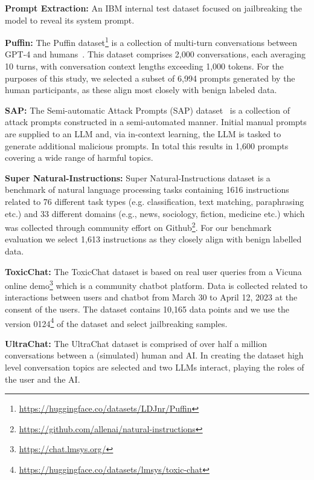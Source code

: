 \noindent\textbf{Prompt Extraction:} An IBM internal test dataset focused on jailbreaking the model to reveal its system prompt.

\noindent\textbf{Puffin:} The Puffin dataset\footnote{\url{https://huggingface.co/datasets/LDJnr/Puffin}} is a collection of multi-turn conversations between GPT-4 and humans~\cite{puffindataset}. This dataset comprises 2,000 conversations, each averaging 10 turns, with conversation context lengths exceeding 1,000 tokens. For the purposes of this study, we selected a subset of 6,994 prompts generated by the human participants, as these align most closely with benign labeled data. 

\noindent\textbf{SAP:} The Semi-automatic Attack Prompts (SAP) dataset~\cite{deng2023attack} is a collection of attack prompts constructed in a semi-automated manner. Initial manual prompts are supplied to an LLM and, via in-context learning, the LLM is tasked to generate additional malicious prompts. In total this results in 1,600 prompts covering a wide range of harmful topics.

\noindent\textbf{Super Natural-Instructions:} Super Natural-Instructions dataset \cite{wang2022super} is a benchmark of natural language processing tasks containing 1616 instructions related to 76 different task types (e.g. classification, text matching, paraphrasing etc.) and 33 different domains (e.g., news, sociology, fiction, medicine etc.) which was collected through community effort on Github\footnote{\url{https://github.com/allenai/natural-instructions}}. For our benchmark evaluation we select 1,613 instructions as they closely align with benign labelled data. 

\noindent\textbf{ToxicChat:} The ToxicChat dataset \cite{lin2023toxicchat} is based on real user queries from a Vicuna online demo\footnote{\url{https://chat.lmsys.org/}} which is a community chatbot platform. Data is collected related to interactions between users and chatbot from March 30 to April 12, 2023 at the consent of the users. The dataset contains 10,165 data points and we use the version 0124\footnote{\url{https://huggingface.co/datasets/lmsys/toxic-chat}} of the dataset and select jailbreaking samples. 

\noindent\textbf{UltraChat:} The UltraChat dataset \cite{ding2023enhancing} is comprised of over half a million conversations between a (simulated) human and AI. In creating the dataset high level conversation topics are selected and two LLMs interact, playing the roles of the user and the AI.

